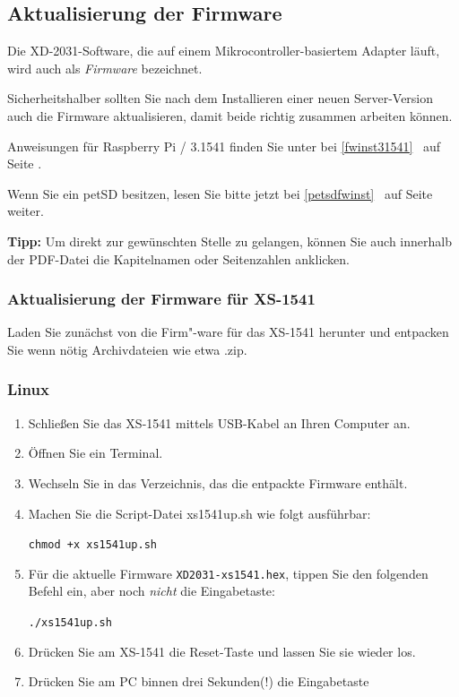\documentclass[10pt,a4paper]{scrartcl}		%
\begin{document}
\subsection{Aktualisierung der Firmware}
Die XD-2031-Software, die auf einem Mikrocontroller-basiertem Adapter
läuft, wird auch als \textit{Firmware} bezeichnet.

Sicherheitshalber sollten Sie nach dem Installieren einer neuen
Server-Version auch die Firmware aktualisieren, damit beide richtig
zusammen arbeiten können.

Anweisungen für Raspberry Pi / 3.1541 finden Sie unter
bei \glqq\ref{fwinst31541} \grqq\ auf Seite
\pageref{fwinst31541}.

Wenn Sie ein petSD besitzen, lesen Sie bitte jetzt bei
\glqq\ref{petsdfwinst} \grqq\ auf Seite
\pageref{petsdfwinst} weiter.

\textbf{Tipp:} Um direkt zur gewünschten Stelle zu gelangen, können 
Sie auch innerhalb der PDF-Datei die Kapitelnamen oder Seitenzahlen 
anklicken.

\subsubsection{Aktualisierung der Firmware für XS-1541}
Laden Sie zunächst von \fwbinaries{} die Firm"-ware für das XS-1541
herunter und entpacken Sie wenn nötig Archivdateien wie 
etwa \glqq .zip\grqq . 

\subsubsection*{Linux}
\begin{enumerate}
\item Schließen Sie das XS-1541 mittels USB-Kabel an Ihren Computer an.
\item Öffnen Sie ein Terminal.
\item Wechseln Sie in das Verzeichnis, das die entpackte Firmware enthält.
\item Machen Sie die Script-Datei xs1541up.sh wie folgt ausführbar:

\texttt{chmod +x xs1541up.sh}
\item Für die aktuelle Firmware \texttt{XD2031-xs1541.hex}, tippen Sie
	den folgenden Befehl ein, aber noch \textit{nicht} die 
	Eingabetaste:

	\texttt{./xs1541up.sh}

\item Drücken Sie am XS-1541 die Reset-Taste und lassen Sie sie wieder los.
\item Drücken Sie am PC binnen drei Sekunden(!) die Eingabetaste
\end{enumerate}
\end{document}
